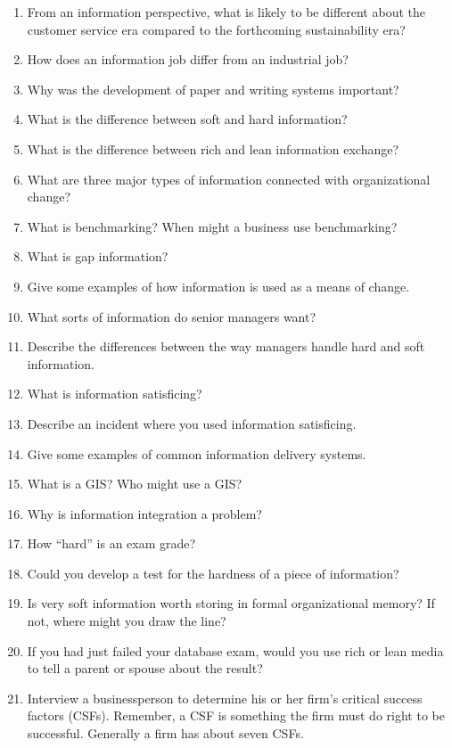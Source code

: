 \documentclass[
]{article}
\begin{document}
\begin{enumerate}
\def\labelenumi{\arabic{enumi}.}
\item
  From an information perspective, what is likely to be different
  about the customer service era compared to the forthcoming
  sustainability era?
\item
  How does an information job differ from an industrial job?
\item
  Why was the development of paper and writing systems important?
\item
  What is the difference between soft and hard information?
\item
  What is the difference between rich and lean information exchange?
\item
  What are three major types of information connected with
  organizational change?
\item
  What is benchmarking? When might a business use benchmarking?
\item
  What is gap information?
\item
  Give some examples of how information is used as a means of change.
\item
  What sorts of information do senior managers want?
\item
  Describe the differences between the way managers handle hard and
  soft information.
\item
  What is information satisficing?
\item
  Describe an incident where you used information satisficing.
\item
  Give some examples of common information delivery systems.
\item
  What is a GIS? Who might use a GIS?
\item
  Why is information integration a problem?
\item
  How ``hard'' is an exam grade?
\item
  Could you develop a test for the hardness of a piece of information?
\item
  Is very soft information worth storing in formal organizational
  memory? If not, where might you draw the line?
\item
  If you had just failed your database exam, would you use rich or
  lean media to tell a parent or spouse about the result?
\item
  Interview a businessperson to determine his or her firm's critical
  success factors (CSFs). Remember, a CSF is something the firm must
  do right to be successful. Generally a firm has about seven CSFs.

\end{enumerate}
\end{document}
